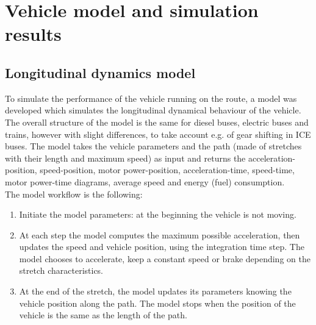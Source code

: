 \documentclass{article}
\begin{document}
\section{Vehicle model and simulation results} %
\subsection{Longitudinal dynamics model} 
To simulate the performance of the vehicle running on the route, a model was developed which simulates the longitudinal dynamical behaviour of the vehicle. The overall structure of the model is the same for diesel buses, electric buses and trains, however with slight differences, to take account e.g. of gear shifting in ICE buses. The model takes the vehicle parameters and the path (made of stretches with their length and maximum speed) as input and returns the acceleration-position, speed-position, motor power-position, acceleration-time, speed-time, motor power-time diagrams, average speed and energy (fuel) consumption.\\
The model workflow is the following:
\begin{enumerate}
\item Initiate the model parameters: at the beginning the vehicle is not moving.
\item At each step the model computes the maximum possible acceleration, then updates the speed and vehicle position, using the integration time step. The model chooses to accelerate, keep a constant speed or brake depending on the stretch characteristics.  
\item At the end of the stretch, the model updates its parameters knowing the vehicle position along the path. The model stops when the position of the vehicle is the same as the length of the path. 
\end{enumerate}
\end{document}
